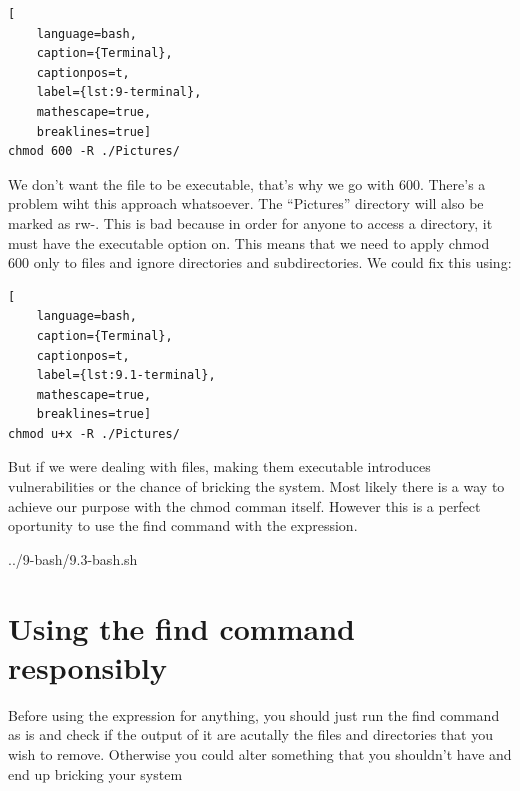 \begin{lstlisting}[
    language=bash, 
    caption={Terminal},
    captionpos=t,
    label={lst:9-terminal}, 
    mathescape=true, 
    breaklines=true]
chmod 600 -R ./Pictures/
\end{lstlisting}

We don't want the file to be executable, that's why we go with 600. There's a problem wiht this approach
whatsoever. The ``Pictures'' directory will also be marked as rw-. This is bad because in order for anyone
to access a directory, it must have the executable option on. This means that we need to apply chmod
600 only to files and ignore directories and subdirectories. We could fix this using:

\begin{lstlisting}[
    language=bash, 
    caption={Terminal},
    captionpos=t,
    label={lst:9.1-terminal}, 
    mathescape=true, 
    breaklines=true]
chmod u+x -R ./Pictures/
\end{lstlisting}

But if we were dealing with files, making them executable introduces vulnerabilities or the chance of
bricking the system. Most likely there is a way to achieve our purpose with the chmod comman itself.
However this is a perfect oportunity to use the find command with the  expression.



{../9-bash/9.3-bash.sh}

\pagebreak
\section{Using the find command responsibly}

Before using the  expression for anything, you should just run the find command as is
and check if the output of it are acutally the files and directories that you wish to remove. Otherwise
you could alter something that you shouldn't have and end up bricking your system